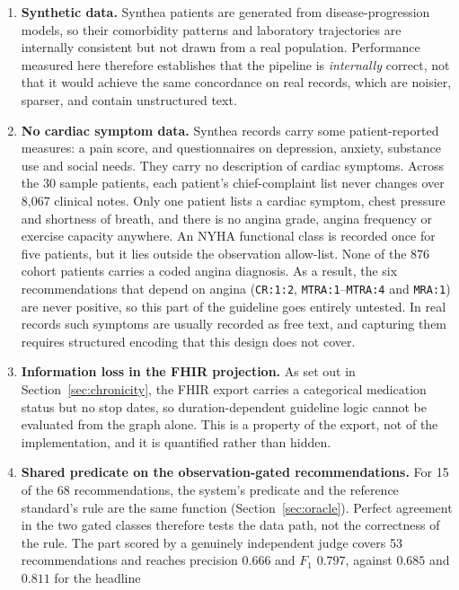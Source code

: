 \begin{enumerate}
    \item \textbf{Synthetic data.} Synthea patients are generated from disease-progression
    models, so their comorbidity patterns and laboratory trajectories are internally
    consistent but not drawn from a real population. Performance measured here therefore
    establishes that the pipeline is \emph{internally} correct, not that it would achieve
    the same concordance on real records, which are noisier, sparser, and contain
    unstructured text.
    \item \textbf{No cardiac symptom data.} Synthea records carry some patient-reported
    measures: a pain score, and questionnaires on depression, anxiety, substance use and social
    needs. They carry no description of cardiac symptoms. Across the 30 sample patients, each
    patient's chief-complaint list never changes over 8{,}067 clinical notes. Only one patient
    lists a cardiac symptom, chest pressure and shortness of breath, and there is no angina
    grade, angina frequency or exercise capacity anywhere. An NYHA functional class is recorded
    once for five patients, but it lies outside the observation allow-list. None of the 876
    cohort patients carries a coded angina diagnosis. As a result, the six recommendations that
    depend on angina (\texttt{CR:1:2}, \texttt{MTRA:1}--\texttt{MTRA:4} and \texttt{MRA:1})
    are never positive, so this part of the guideline goes entirely untested. In real records
    such symptoms are usually recorded as free text, and capturing them requires structured
    encoding that this design does not cover.
    \item \textbf{Information loss in the FHIR projection.} As set out in
    Section~\ref{sec:chronicity}, the FHIR export carries a categorical medication status
    but no stop dates, so duration-dependent guideline logic cannot be evaluated from the
    graph alone. This is a property of the export, not of the implementation, and it is
    quantified rather than hidden.
    \item \textbf{Shared predicate on the observation-gated recommendations.} For 15 of the 68
    recommendations, the system's predicate and the reference standard's rule are the same
    function (Section~\ref{sec:oracle}). Perfect agreement in the two gated classes therefore
    tests the data path, not the correctness of the rule. The part scored by a genuinely
    independent judge covers 53 recommendations and reaches precision $0.666$ and $F_1$
    $0.797$, against $0.685$ and $0.811$ for the headline

\end{enumerate}
